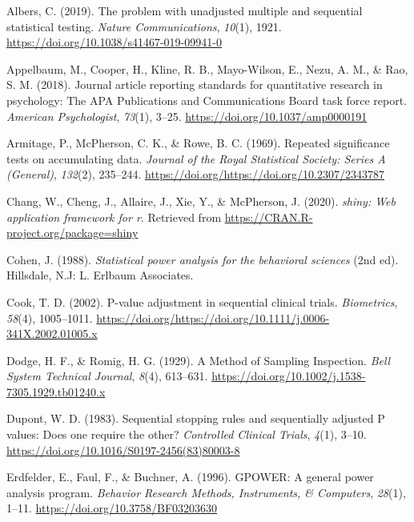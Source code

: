 \documentclass[
  english,
  ,man,floatsintext]{apa6}
\newlength{\cslhangindent}
\newenvironment{cslreferences}%
  {\setlength{\parindent}{0pt}%
  \everypar{\setlength{\hangindent}{\cslhangindent}}\ignorespaces}%
  {\par}
\begin{document}
\hypertarget{refs}{}
\begin{cslreferences}
\leavevmode\hypertarget{ref-albers_problem_2019}{}%
Albers, C. (2019). The problem with unadjusted multiple and sequential statistical testing. \emph{Nature Communications}, \emph{10}(1), 1921. \url{https://doi.org/10.1038/s41467-019-09941-0}

\leavevmode\hypertarget{ref-appelbaum_journal_2018}{}%
Appelbaum, M., Cooper, H., Kline, R. B., Mayo-Wilson, E., Nezu, A. M., \& Rao, S. M. (2018). Journal article reporting standards for quantitative research in psychology: The APA Publications and Communications Board task force report. \emph{American Psychologist}, \emph{73}(1), 3--25. \url{https://doi.org/10.1037/amp0000191}

\leavevmode\hypertarget{ref-armitage_repeated_1969}{}%
Armitage, P., McPherson, C. K., \& Rowe, B. C. (1969). Repeated significance tests on accumulating data. \emph{Journal of the Royal Statistical Society: Series A (General)}, \emph{132}(2), 235--244. \url{https://doi.org/https://doi.org/10.2307/2343787}

\leavevmode\hypertarget{ref-shiny_app_2020}{}%
Chang, W., Cheng, J., Allaire, J., Xie, Y., \& McPherson, J. (2020). \emph{shiny: Web application framework for r}. Retrieved from \url{https://CRAN.R-project.org/package=shiny}

\leavevmode\hypertarget{ref-cohen_statistical_1988}{}%
Cohen, J. (1988). \emph{Statistical power analysis for the behavioral sciences} (2nd ed). Hillsdale, N.J: L. Erlbaum Associates.

\leavevmode\hypertarget{ref-cook_p-value_2002}{}%
Cook, T. D. (2002). P-value adjustment in sequential clinical trials. \emph{Biometrics}, \emph{58}(4), 1005--1011. \url{https://doi.org/https://doi.org/10.1111/j.0006-341X.2002.01005.x}

\leavevmode\hypertarget{ref-dodge_method_1929}{}%
Dodge, H. F., \& Romig, H. G. (1929). A Method of Sampling Inspection. \emph{Bell System Technical Journal}, \emph{8}(4), 613--631. \url{https://doi.org/10.1002/j.1538-7305.1929.tb01240.x}

\leavevmode\hypertarget{ref-dupont_sequential_1983}{}%
Dupont, W. D. (1983). Sequential stopping rules and sequentially adjusted P values: Does one require the other? \emph{Controlled Clinical Trials}, \emph{4}(1), 3--10. \url{https://doi.org/10.1016/S0197-2456(83)80003-8}

\leavevmode\hypertarget{ref-erdfelder_gpower_1996}{}%
Erdfelder, E., Faul, F., \& Buchner, A. (1996). GPOWER: A general power analysis program. \emph{Behavior Research Methods, Instruments, \& Computers}, \emph{28}(1), 1--11. \url{https://doi.org/10.3758/BF03203630}


\end{cslreferences}
\end{document}
